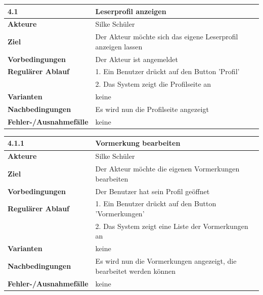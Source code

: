 \documentclass[fontsize=12pt,paper=a4,twoside]{scrartcl}
\begin{document}
\begin{table}[htbp]
\label{4.1}
\begin{tabular}{|l|p{10cm}|}
\hline 
\textbf{4.1} & \textbf{Leserprofil anzeigen} \\ \hline
\textbf{Akteure} & Silke Schüler\\ \hline
\textbf{Ziel} & Der Akteur möchte sich das eigene Leserprofil anzeigen lassen  \\ \hline
\textbf{Vorbedingungen} & Der Akteur ist angemeldet  \\ \hline
\textbf{Regulärer Ablauf} & 
1. Ein Benutzer drückt auf den Button 'Profil' \\
&2. Das System zeigt die Profilseite an\\
\hline
\textbf{Varianten} & 
keine \\ \hline
\textbf{Nachbedingungen} & Es wird nun die Profilseite angezeigt \\ \hline
\textbf{Fehler-/Ausnahmefälle} & keine\\
\hline
\end{tabular}
\end{table}

\begin{table}[htbp]
\label{4.1.1}
\begin{tabular}{|l|p{10cm}|}
\hline 
\textbf{4.1.1} & \textbf{Vormerkung bearbeiten} \\ \hline
\textbf{Akteure} & Silke Schüler\\ \hline
\textbf{Ziel} & Der Akteur möchte die eigenen Vormerkungen bearbeiten  \\ \hline
\textbf{Vorbedingungen} & Der Benutzer hat sein Profil geöffnet  \\ \hline
\textbf{Regulärer Ablauf} & 
1. Ein Benutzer drückt auf den Button 'Vormerkungen' \\
&2. Das System zeigt eine Liste der Vormerkungen an\\
\hline
\textbf{Varianten} & 
keine \\ \hline
\textbf{Nachbedingungen} & Es wird nun die Vormerkungen angezeigt, die bearbeitet werden können \\ \hline
\textbf{Fehler-/Ausnahmefälle} & keine\\
\hline
\end{tabular}
\end{table}
\end{document}

